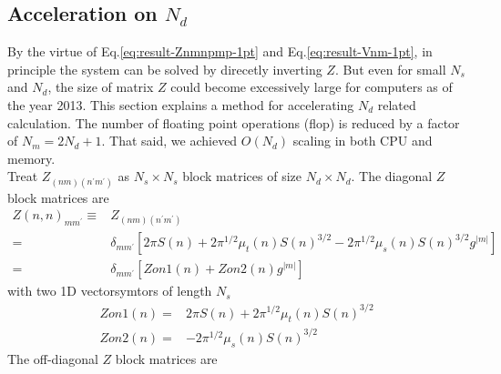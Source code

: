 \documentclass [10pt,letterpaper]{article}
\begin{document}
\subsection{Acceleration on $N_d$}
\label{sub:acceleration-on-Nd}
By the virtue of Eq.\eqref{eq:result-Znmnpmp-1pt} and Eq.\eqref{eq:result-Vnm-1pt}, in principle the system can be solved by direcetly inverting $Z$. 
But  even for small $N_s$ and $N_d$, the size of matrix $Z$ could become excessively large for computers as of the year 2013.  
This section explains a method for accelerating $N_d$ related calculation. 
The number of floating point operations (flop) is reduced by a factor of $N_m=2N_d+1$. 
That said, we achieved $O(N_d)$ scaling in both CPU and memory.
\\
Treat $Z_{(n m)(n^\prime m^\prime)}$ as $N_s\times N_s$ block matrices of size $N_d\times N_d$. The diagonal $Z$ block matrices are
\begin{equation} \label{eq:def-Znnp-diagonal}
	\begin{split}
		Z(n,n)_{m m^\prime}
		\equiv
		& 
		Z_{(n m)(n^\prime m^\prime)}
		\\
		=&
		\delta_{m m^\prime}
		[
			2\pi S(n)
			+
			2\pi^{1/2}
			\mu_t(n)
			S(n)^{3/2}
			-
			2\pi^{1/2}
			\mu_s(n)
			S(n)^{3/2}
			g^{\lvert m \rvert}
		]
		\\
		=&
		\delta_{m m^\prime}
		[
			Zon1(n)
			+
			Zon2(n)
			g^{\lvert m \rvert}
		]
	\end{split}
\end{equation}
with two 1D vectorsymtors of length $N_s$
\begin{subequations} \label{eq:def-Zon1-Zon2}
	\begin{align}
		Zon1(n)
		=&
		2\pi S(n)
		+
		2\pi^{1/2}
		\mu_t(n)
		S(n)^{3/2}
		\label{eq:def-Zon1}
		\\
		Zon2(n)
		=& 
		-
		2\pi^{1/2}
		\mu_s(n)
		S(n)^{3/2}
		\label{eq:def_Zon2}
	\end{align}
\end{subequations}
The off-diagonal $Z$ block matrices are
\end{document}
